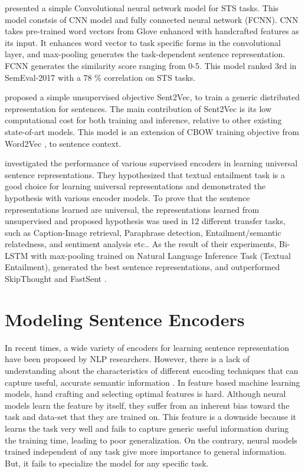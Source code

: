 \documentclass[12pt]{report} %
\begin{document}
\cite{shao2017hcti} presented a simple Convolutional neural network model for STS tasks. This model constsis of CNN model and fully connected neural network (FCNN). CNN takes pre-trained word vectors from Glove \cite{pennington2014glove} enhanced with handcrafted features as its input. It enhances word vector to task specific forms in the convolutional layer, and max-pooling generates the task-dependent sentence representation. FCNN generates the similarity score ranging from 0-5. This model ranked 3rd in SemEval-2017 with a 78 \% correlation on STS tasks. 


\cite{pagliardini2017unsupervised} proposed a simple unsupervised objective Sent2Vec, to train a generic distributed representation for sentences. The main contribution of Sent2Vec is its low computational cost for both training and inference, relative to other existing state-of-art models. This model is an extension of CBOW training objective from Word2Vec \citep{mikolov2014word2vec}, to sentence context.


\cite{conneau2017supervised} investigated the performance of various supervised encoders in learning universal sentence representations. They hypothesized that textual entailment task is a good choice for learning universal representations and demonstrated the hypothesis with various encoder models. To prove that the sentence representations learned are universal, the representations learned from unsupervised and proposed hypothesis was used in 12 different transfer tasks, such as Caption-Image retrieval, Paraphrase detection, Entailment/semantic relatedness, and sentiment analysis etc.. As the result of their experiments, Bi-LSTM with max-pooling trained on Natural Language Inference Task (Textual Entailment), generated the best sentence representations, and outperformed SkipThought \cite{kiros2015skip} and FastSent \cite{hill2016learning}.

\chapter{Modeling Sentence Encoders}

In recent times, a wide variety of encoders for learning sentence representation have been proposed by NLP researchers. However, there is a lack of understanding about the characteristics of different encoding techniques that can capture useful, accurate semantic information \citep{conneau2017supervised}. In feature based machine learning models, hand crafting and selecting optimal features is hard. Although neural models learn the feature by itself, they suffer from an inherent bias toward the task and data-set that they are trained on.
This feature is a downside because it learns the task very well and fails to capture generic useful information during the training time, leading to poor generalization. On the contrary, neural models trained independent of any task give more importance to general information. But, it fails to specialize the model for any specific task. 
\end{document}
